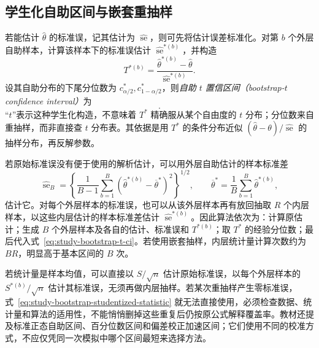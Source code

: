 \subsection{学生化自助区间与嵌套重抽样}
\label{subsec:study-bootstrap-t-ci}

若能估计 $\widehat\theta$ 的标准误，记其估计为 $\widehat{\operatorname{se}}$，则可先将估计误差标准化。对第 $b$ 个外层自助样本，计算该样本下的标准误估计 $\widehat{\operatorname{se}}^{*(b)}$，并构造
\begin{equation}
  T^{*(b)}=
  \frac{\widehat\theta^{*(b)}-\widehat\theta}
       {\widehat{\operatorname{se}}^{*(b)}}.
  \label{eq:study-bootstrap-studentized-statistic}
\end{equation}
设其自助分布的下尾分位数为 $c_{\alpha/2}^*,c_{1-\alpha/2}^*$，则\emph{自助 $t$ 置信区间（bootstrap-$t$ confidence interval）}为
\begin{equation}
  [\,\widehat\theta-c_{1-\alpha/2}^*
                         \widehat{\operatorname{se}},\,
      \widehat\theta-c_{\alpha/2}^*
                         \widehat{\operatorname{se}}\,].
  \label{eq:study-bootstrap-t-ci}
\end{equation}
“$t$”表示这种学生化构造，不意味着 $T^*$ 精确服从某个自由度的 $t$ 分布；分位数来自重抽样，而非直接查 $t$ 分布表。其依据是用 $T^*$ 的条件分布近似 $(\widehat\theta-\theta)/\widehat{\operatorname{se}}$ 的抽样分布，再反解参数。

若原始标准误没有便于使用的解析估计，可以用外层自助估计的样本标准差
\begin{equation}
  \widehat{\operatorname{se}}_B
  =\left\{\frac1{B-1}\sum_{b=1}^B
       (\widehat\theta^{*(b)}-\overline\theta^*)^2\right\}^{1/2},
  \qquad
  \overline\theta^*=\frac1B\sum_{b=1}^B\widehat\theta^{*(b)},
  \label{eq:study-bootstrap-standard-error}
\end{equation}
估计它。对每个外层样本的标准误，也可以从该外层样本再有放回抽取 $R$ 个内层样本，以这些内层估计的样本标准差估计 $\widehat{\operatorname{se}}^{*(b)}$。因此算法依次为：计算原估计；生成 $B$ 个外层样本及各自的估计、标准误和 $T^{*(b)}$；取 $T^*$ 的经验分位数；最后代入式~\eqref{eq:study-bootstrap-t-ci}。若使用嵌套抽样，内层统计量计算次数约为 $BR$，明显高于基本区间的 $B$ 次。

若统计量是样本均值，可以直接以 $S/\sqrt n$ 估计原始标准误，以每个外层样本的 $S^{*(b)}/\sqrt n$ 估计其标准误，无须再做内层抽样。若某次重抽样产生零标准误，式~\eqref{eq:study-bootstrap-studentized-statistic} 就无法直接使用，必须检查数据、统计量和算法的适用性，不能悄悄删掉这些重复后仍按原公式解释覆盖率。教材还提及标准正态自助区间、百分位数区间和偏差校正加速区间；它们使用不同的校准方式，不应仅凭同一次模拟中哪个区间最短来选择方法。

